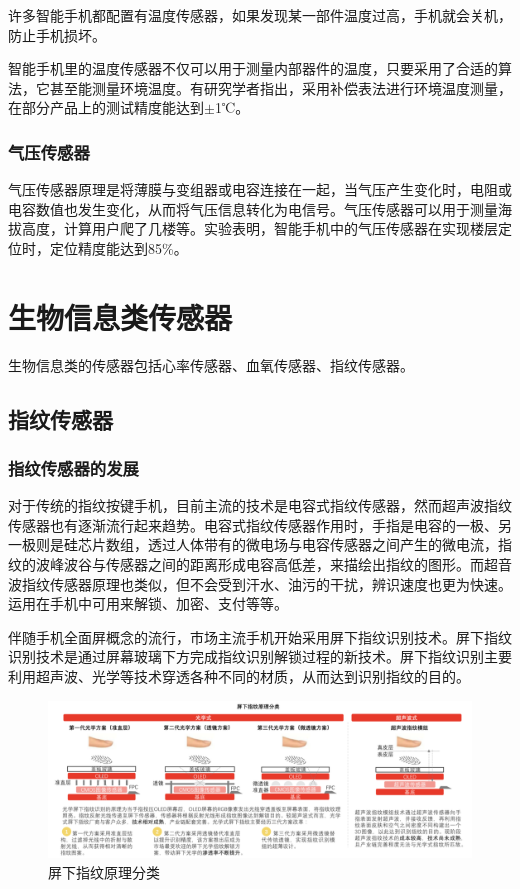 \documentclass[lang=cn]{elegantpaper}
\begin{document}
许多智能手机都配置有温度传感器，如果发现某一部件温度过高，手机就会关机，防止手机损坏。

智能手机里的温度传感器不仅可以用于测量内部器件的温度，只要采用了合适的算法，它甚至能测量环境温度。有研究学者指出，采用补偿表法进行环境温度测量，在部分产品上的测试精度能达到$\pm$1℃\cite{Temperature}。

\subsubsection{气压传感器}

气压传感器原理是将薄膜与变组器或电容连接在一起，当气压产生变化时，电阻或电容数值也发生变化，从而将气压信息转化为电信号。气压传感器可以用于测量海拔高度，计算用户爬了几楼等。实验表明，智能手机中的气压传感器在实现楼层定位时，定位精度能达到85\%\cite{storeyDetect}。


\section{生物信息类传感器}

生物信息类的传感器包括心率传感器、血氧传感器、指纹传感器。

\subsection{指纹传感器}

\subsubsection{指纹传感器的发展}

对于传统的指纹按键手机，目前主流的技术是电容式指纹传感器，然而超声波指纹传感器也有逐渐流行起来趋势。电容式指纹传感器作用时，手指是电容的一极、另一极则是硅芯片数组，透过人体带有的微电场与电容传感器之间产生的微电流，指纹的波峰波谷与传感器之间的距离形成电容高低差，来描绘出指纹的图形。而超音波指纹传感器原理也类似，但不会受到汗水、油污的干扰，辨识速度也更为快速。运用在手机中可用来解锁、加密、支付等等。

伴随手机全面屏概念的流行，市场主流手机开始采用屏下指纹识别技术。屏下指纹识别技术是通过屏幕玻璃下方完成指纹识别解锁过程的新技术。屏下指纹识别主要利用超声波、光学等技术穿透各种不同的材质，从而达到识别指纹的目的。\cite{UsageWid}

\begin{figure}[H]
    \centering
    \includegraphics[width=1.0\textwidth]{1-1.png}
    \caption{屏下指纹原理分类}
\end{figure}
\end{document}
